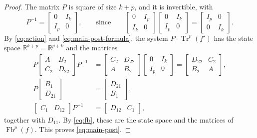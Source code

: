 \documentclass[11pt,a4paper]{article}
\theoremstyle{plain}
\theoremstyle{definition}
\theoremstyle{remark}
\DeclareMathOperator{\Fb}{Fb}
\DeclareMathOperator{\Tr}{Tr}
\newcommand{\R}{\mathbb{R}}
\begin{document}
\begin{proof}
    The matrix $P$ is square of size $k + p$, and it is invertible, with
    \begin{equation*}
        P^{-1} = \begin{bmatrix} 0 & I_k \\ I_p & 0 \end{bmatrix},
        \qquad \text{since} \qquad
        \begin{bmatrix} 0 & I_p \\ I_k & 0 \end{bmatrix} \begin{bmatrix} 0 & I_k \\ I_p & 0 \end{bmatrix} = \begin{bmatrix} I_p & 0 \\ 0 & I_k \end{bmatrix} .
    \end{equation*}
    By \cref{eq:action} and \cref{eq:main-post-formula}, the system $P \cdot \Tr^p(f')$ has the state space $\R^{k+p} = \R^{p+k}$ and the matrices
    \begin{align*}
        P \begin{bmatrix} A & B_2 \\ C_2 & D_{22} \end{bmatrix} P^{-1}
         & = \begin{bmatrix} C_2 & D_{22} \\ A & B_2 \end{bmatrix} \begin{bmatrix} 0 & I_k \\ I_p & 0 \end{bmatrix}
        = \begin{bmatrix} D_{22} & C_2 \\ B_2 & A \end{bmatrix}, \\
        P \begin{bmatrix} B_1 \\ D_{21} \end{bmatrix}
         & = \begin{bmatrix} D_{21} \\ B_1 \end{bmatrix}, \\
        \begin{bmatrix} C_1 & D_{12} \end{bmatrix} P^{-1}
         & = \begin{bmatrix} D_{12} & C_1 \end{bmatrix},
    \end{align*}
    together with $D_{11}$.
    By \cref{eq:fb}, these are the state space and the matrices of $\Fb^p(f)$.
    This proves \cref{eq:main-post}.


\end{proof}
\end{document}
